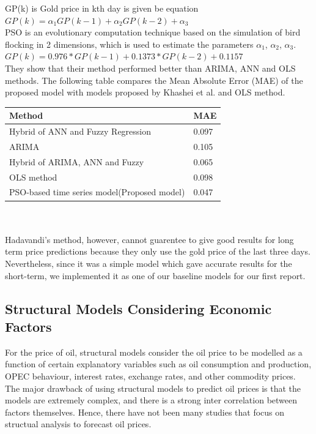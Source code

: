 \documentclass[runningheads]{llncs}
\begin{document}
GP(k) is Gold price in kth day is given be equation \\

${GP(k) = \alpha_1  GP(k-1) + \alpha_2GP(k-2)+ \alpha_3}$ \\

PSO is an evolutionary computation technique based on the simulation of bird flocking in 2 dimensions, which is used to estimate the parameters $\alpha_1$, $\alpha_2$, $\alpha_3$. \\

${GP(k) = 0.976*GP(k-1) + 0.1373*GP(k-2)+ 0.1157}$ \\

They show that their method performed  better than ARIMA, ANN and OLS methods\cite{gold-ref1}. The following table compares the Mean Absolute Error (MAE) of the proposed model with models proposed by Khashei et al. \cite{gold-ref2} and OLS method. \\

\begin{tabular}{|l|l|}
\hline
Method & MAE \\ \hline
Hybrid of ANN and Fuzzy Regression \cite{gold-ref2} & 0.097 \\ \hline
ARIMA \cite{gold-ref2} & 0.105 \\ \hline
Hybrid of ARIMA, ANN and Fuzzy \cite{gold-ref1} & 0.065 \\ \hline
OLS method & 0.098 \\ \hline
PSO-based time series model(Proposed model) & 0.047 \\ \hline
\end{tabular} \\ \\

Hadavandi's method, however, cannot guarentee to give good results for long term price predictions because they only use the gold price of the last three days. Nevertheless, since it was a simple model which gave accurate results for the short-term, we implemented it as one of our baseline models for our first report.

\subsection{Structural Models Considering Economic Factors}

For the price of oil, structural models consider the oil price to be modelled as a function of certain explanatory variables such as oil consumption and production, OPEC behaviour, interest rates, exchange rates, and other commodity prices. The major drawback of using structural models to predict oil prices is that the models are extremely complex, and there is a strong inter correlation between factors themselves. Hence, there have not been many studies that focus on structual analysis to forecast oil prices.
\end{document}
